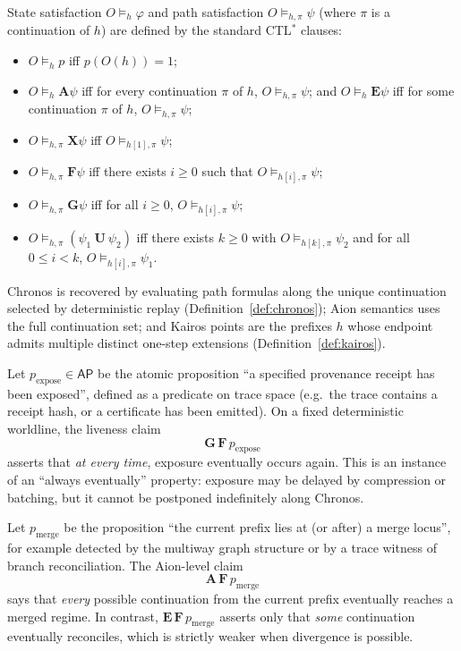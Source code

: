 \documentclass{aion}
\begin{document}
State satisfaction $O\models_h\varphi$ and path satisfaction $O\models_{h,\pi}\psi$ (where $\pi$ is a continuation of $h$)
are defined by the standard CTL$^\ast$ clauses:
\begin{itemize}[leftmargin=*]
  \item $O\models_h p$ iff $p(O(h))=1$;
  \item $O\models_h \mathbf{A}\psi$ iff for every continuation $\pi$ of $h$, $O\models_{h,\pi}\psi$;
        and $O\models_h \mathbf{E}\psi$ iff for some continuation $\pi$ of $h$, $O\models_{h,\pi}\psi$;
  \item $O\models_{h,\pi}\mathbf{X}\psi$ iff $O\models_{h[1],\pi}\psi$;
  \item $O\models_{h,\pi}\mathbf{F}\psi$ iff there exists $i\ge 0$ such that $O\models_{h[i],\pi}\psi$;
  \item $O\models_{h,\pi}\mathbf{G}\psi$ iff for all $i\ge 0$, $O\models_{h[i],\pi}\psi$;
  \item $O\models_{h,\pi}(\psi_1\ \mathbf{U}\ \psi_2)$ iff there exists $k\ge 0$ with
        $O\models_{h[k],\pi}\psi_2$ and for all $0\le i<k$, $O\models_{h[i],\pi}\psi_1$.
\end{itemize}
Chronos is recovered by evaluating path formulas along the unique continuation selected by deterministic replay
(Definition~\ref{def:chronos}); Aion semantics uses the full continuation set; and Kairos points are the prefixes $h$
whose endpoint admits multiple distinct one-step extensions (Definition~\ref{def:kairos}).

\begin{example}\label{ex:temporal-liveness}
Let $p_{\mathrm{expose}}\in\mathsf{AP}$ be the atomic proposition ``a specified provenance receipt has been exposed'',
defined as a predicate on trace space (e.g.\ the trace contains a receipt hash, or a certificate has been emitted).
On a fixed deterministic worldline, the liveness claim
\[
  \mathbf{G}\,\mathbf{F}\,p_{\mathrm{expose}}
\]
asserts that \emph{at every time}, exposure eventually occurs again.
This is an instance of an ``always eventually'' property: exposure may be delayed by compression or batching,
but it cannot be postponed indefinitely along Chronos.
\end{example}

\begin{example}\label{ex:temporal-reconcile}
Let $p_{\mathrm{merge}}$ be the proposition ``the current prefix lies at (or after) a merge locus'',
for example detected by the multiway graph structure or by a trace witness of branch reconciliation.
The Aion-level claim
\[
  \mathbf{A}\,\mathbf{F}\,p_{\mathrm{merge}}
\]
says that \emph{every} possible continuation from the current prefix eventually reaches a merged regime.
In contrast, $\mathbf{E}\,\mathbf{F}\,p_{\mathrm{merge}}$ asserts only that \emph{some} continuation eventually reconciles,
which is strictly weaker when divergence is possible.
\end{example}
\end{document}
